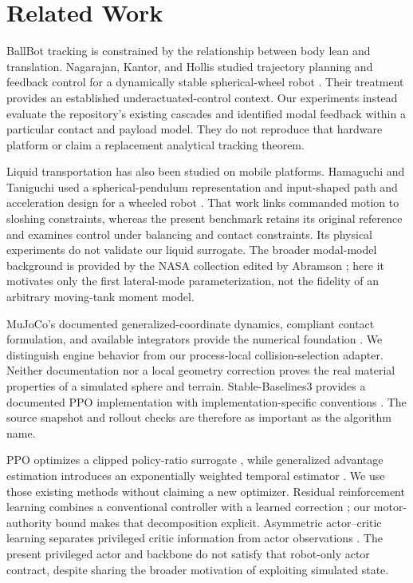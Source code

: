 \section{Related Work}
BallBot tracking is constrained by the relationship between body lean and translation. Nagarajan, Kantor, and Hollis studied trajectory planning and feedback control for a dynamically stable spherical-wheel robot \cite{nagarajan2009}. Their treatment provides an established underactuated-control context. Our experiments instead evaluate the repository's existing cascades and identified modal feedback within a particular contact and payload model. They do not reproduce that hardware platform or claim a replacement analytical tracking theorem.

Liquid transportation has also been studied on mobile platforms. Hamaguchi and Taniguchi used a spherical-pendulum representation and input-shaped path and acceleration design for a wheeled robot \cite{hamaguchi2005}. That work links commanded motion to sloshing constraints, whereas the present benchmark retains its original reference and examines control under balancing and contact constraints. Its physical experiments do not validate our liquid surrogate. The broader modal-model background is provided by the NASA collection edited by Abramson \cite{abramson1966}; here it motivates only the first lateral-mode parameterization, not the fidelity of an arbitrary moving-tank moment model.

MuJoCo's documented generalized-coordinate dynamics, compliant contact formulation, and available integrators provide the numerical foundation \cite{mujoco332}. We distinguish engine behavior from our process-local collision-selection adapter. Neither documentation nor a local geometry correction proves the real material properties of a simulated sphere and terrain. Stable-Baselines3 provides a documented PPO implementation with implementation-specific conventions \cite{raffin2021,sb3ppo}. The source snapshot and rollout checks are therefore as important as the algorithm name.

PPO optimizes a clipped policy-ratio surrogate \cite{schulman2017}, while generalized advantage estimation introduces an exponentially weighted temporal estimator \cite{schulman2015}. We use those existing methods without claiming a new optimizer. Residual reinforcement learning combines a conventional controller with a learned correction \cite{johannink2018}; our motor-authority bound makes that decomposition explicit. Asymmetric actor--critic learning separates privileged critic information from actor observations \cite{pinto2017}. The present privileged actor and backbone do not satisfy that robot-only actor contract, despite sharing the broader motivation of exploiting simulated state.

